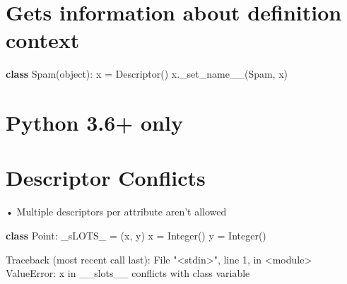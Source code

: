 \documentclass[
  letterpaper,
  DIV=11,
  numbers=noendperiod]{scrreprt}
\newenvironment{Shaded}{\begin{snugshade}}{\end{snugshade}}
\newcommand{\BuiltInTok}[1]{\textcolor[rgb]{0.00,0.23,0.31}{#1}}
\newcommand{\KeywordTok}[1]{\textcolor[rgb]{0.00,0.23,0.31}{\textbf{#1}}}
\newcommand{\NormalTok}[1]{\textcolor[rgb]{0.00,0.23,0.31}{#1}}
\newcommand{\OperatorTok}[1]{\textcolor[rgb]{0.37,0.37,0.37}{#1}}
\newcommand{\StringTok}[1]{\textcolor[rgb]{0.13,0.47,0.30}{#1}}
\begin{document}

\chapter{Gets information about definition
context}\label{gets-information-about-definition-context}

\begin{Shaded}
\begin{Highlighting}[]
\KeywordTok{class}\NormalTok{ Spam(}\BuiltInTok{object}\NormalTok{):}
\NormalTok{    x }\OperatorTok{=}\NormalTok{ Descriptor()}
\NormalTok{        x.\_set\_name\_\_(Spam, }\StringTok{\textquotesingle{}x\textquotesingle{}}\NormalTok{) }
\end{Highlighting}
\end{Shaded}


\chapter{Python 3.6+ only}\label{python-3.6-only}


\chapter{Descriptor Conflicts}\label{descriptor-conflicts}

• Multiple descriptors per attribute aren't allowed

\begin{Shaded}
\begin{Highlighting}[]
\KeywordTok{class}\NormalTok{ Point: \_sLOTS\_ }\OperatorTok{=}\NormalTok{ (}\StringTok{\textquotesingle{}x\textquotesingle{}}\NormalTok{, }\StringTok{\textquotesingle{}y\textquotesingle{}}\NormalTok{) x }\OperatorTok{=}\NormalTok{ Integer() y }\OperatorTok{=}\NormalTok{ Integer() }
\end{Highlighting}
\end{Shaded}

\begin{Shaded}
\begin{Highlighting}[]
\NormalTok{Traceback (most recent call last):}
\NormalTok{    File "\textless{}stdin\textgreater{}", line 1, in \textless{}module\textgreater{}}
\NormalTok{ValueError: \textquotesingle{}x\textquotesingle{} in \_\_slots\_\_ conflicts with class variable }
\end{Highlighting}
\end{Shaded}
\end{document}
